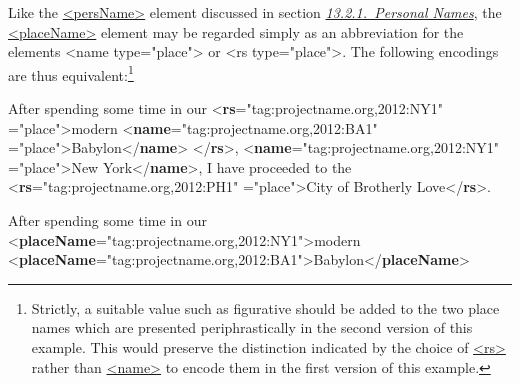 Like the \hyperref[TEI.persName]{<persName>} element discussed in section \textit{\hyperref[NDPER]{13.2.1.\ Personal Names}}, the \hyperref[TEI.placeName]{<placeName>} element may be regarded simply as an abbreviation for the elements <name type="place"> or <rs type="place">. The following encodings are thus equivalent:\footnote{Strictly, a suitable value such as figurative should be added to the two place names which are presented periphrastically in the second version of this example. This would preserve the distinction indicated by the choice of \hyperref[TEI.rs]{<rs>} rather than \hyperref[TEI.name]{<name>} to encode them in the first version of this example.} \par\bgroup{}\exampleFont \begin{shaded}\noindent\mbox{}After spending some time in our {<\textbf{rs}\hspace*{1em}{ref}="{tag:projectname.org,2012:NY1}"\mbox{}\newline 
\hspace*{1em}{type}="{place}">}modern {<\textbf{name}\hspace*{1em}{ref}="{tag:projectname.org,2012:BA1}"\mbox{}\newline 
\hspace*{1em}\hspace*{1em}{type}="{place}">}Babylon{</\textbf{name}>}\mbox{}\newline 
{</\textbf{rs}>}, {<\textbf{name}\hspace*{1em}{ref}="{tag:projectname.org,2012:NY1}"\mbox{}\newline 
\hspace*{1em}{type}="{place}">}New York{</\textbf{name}>}, I have proceeded to the {<\textbf{rs}\hspace*{1em}{ref}="{tag:projectname.org,2012:PH1}"\mbox{}\newline 
\hspace*{1em}{type}="{place}">}City of Brotherly Love{</\textbf{rs}>}.\end{shaded}\egroup\par \noindent  \par\bgroup{}\exampleFont \begin{shaded}\noindent\mbox{}After spending some time in our {<\textbf{placeName}\hspace*{1em}{ref}="{tag:projectname.org,2012:NY1}">}modern {<\textbf{placeName}\hspace*{1em}{ref}="{tag:projectname.org,2012:BA1}">}Babylon{</\textbf{placeName}>}\mbox{}\newline 

\end{shaded}

